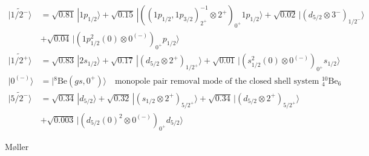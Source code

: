 \documentclass[a4paper,12pt]{book}
\numberwithin{equation}{section}
\numberwithin{figure}{section}
\numberwithin{table}{section}
\newcommand{\ket}[1]{|{#1} \rangle }
\begin{document}
\begin{align*}
\ket{\widetilde{1/2^-}}&=\sqrt{0.81}\,\ket{1p_{1/2}}+\sqrt{0.15}\,\ket{((1p_{1/2},1p_{3/2})^{-1}_{2^+}\otimes2^+)_{0^+}1p_{1/2}}+\sqrt{0.02}\,\ket{(d_{5/2}\otimes3^-)_{1/2^-}}\\
&+\sqrt{0.04}\,\ket{(1p^2_{1/2}(0)\otimes0^{(-)})_{0^+}p_{1/2}}\\
\ket{\widetilde{1/2^+}}&=\sqrt{0.83}\,\ket{2s_{1/2}}+\sqrt{0.17}\,\ket{(d_{5/2}\otimes2^+)_{1/2^+}}+\sqrt{0.01}\,\ket{(s^2_{1/2}(0)\otimes0^{(-)})_{0^+}s_{1/2}}\\
\ket{0^{(-)}}&=\ket{^8\text{Be}(gs,0^+)}\quad\text{monopole pair removal mode of the closed shell system $^{10}_4$Be$_6$}\\
\ket{\widetilde{5/2^-}}&=\sqrt{0.34}\,\ket{d_{5/2}}+\sqrt{0.32}\,\ket{(s_{1/2}\otimes2^+)_{5/2^+}}+\sqrt{0.34}\,\ket{(d_{5/2}\otimes2^+)_{5/2^+}}\\
&+\sqrt{0.003}\,\ket{(d_{5/2}(0)^2\otimes0^{(-)})_{0^+}d_{5/2}}
\end{align*}






M\o ller
\end{document}
